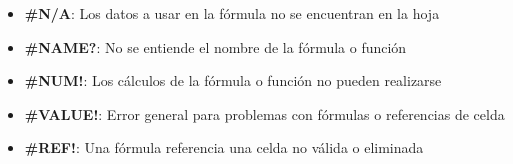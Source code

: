\begin{description}
{\begin{description}
{\begin{itemize}
            \item {\textbf{\#N/A}: Los datos a usar en la fórmula no se encuentran en la hoja}
            \item {\textbf{\#NAME?}: No se entiende el nombre de la fórmula o función}
            \item {\textbf{\#NUM!}: Los cálculos de la fórmula o función no pueden realizarse}
            \item {\textbf{\#VALUE!}: Error general para problemas con fórmulas o referencias de celda}
            \item {\textbf{\#REF!}: Una fórmula referencia una celda no válida o eliminada}
        \end{itemize}} 
    \end{description}}
\end{description}

\newpage




